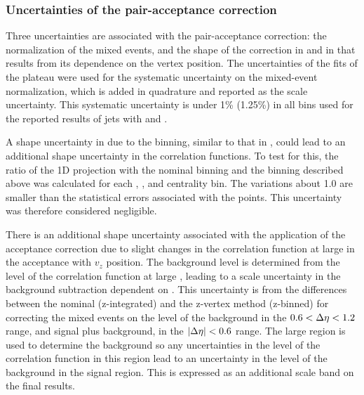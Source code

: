 \subsubsection{Uncertainties of the pair-acceptance correction}
\label{sect:MixedEventsUnc}
Three uncertainties are associated with the pair-acceptance correction: the normalization of the mixed events, and the shape of the correction in \dphi and in \deta that results from its dependence on the vertex position.
%
The uncertainties of the fits of the plateau were used for the systematic uncertainty on the mixed-event normalization, which is added in quadrature and reported as the scale uncertainty.  This systematic uncertainty is under 1\% (1.25\%) in all  bins used for the reported results of jets with   and  .

A shape uncertainty in \dphi due to the \zvtx binning, similar to that in \deta, could lead to an additional shape uncertainty in the correlation functions.  To test for this, the ratio of the 1D \dphi projection with the nominal \zvtx binning and the binning described above was calculated for each , , and centrality bin.  The variations about 1.0 are smaller than the statistical errors associated with the points.  This uncertainty was therefore considered negligible.

There is an additional shape uncertainty associated with the application of the acceptance correction due to slight changes in the correlation function at large \deta in the acceptance with $v_z$ position.  The background level is determined from the level of the correlation function at large \deta, leading to a scale uncertainty in the background subtraction dependent on .  This uncertainty is from the differences between the nominal (z-integrated) and the z-vertex method (z-binned) for correcting the mixed events on the level of the background in the $0.6 < \Delta\eta < 1.2$ range, and signal plus background, in the $|\Delta\eta| < 0.6$ range.  The large \deta region is used to determine the background so any uncertainties in the level of the correlation function in this region lead to an uncertainty in the level of the background in the signal region.  This is expressed as an additional scale band on the final results.

